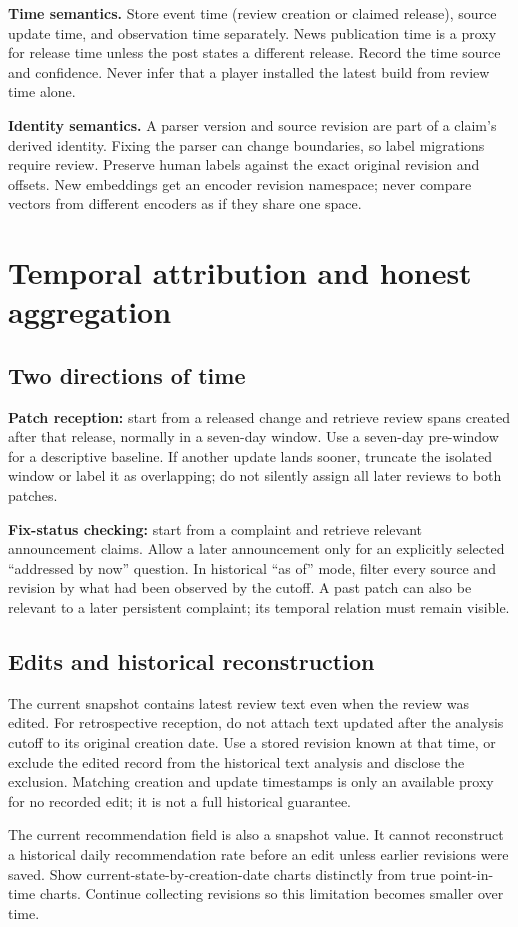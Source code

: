 \documentclass[10pt,letterpaper]{article}
\newcommand{\key}[1]{\textbf{\color{ink}#1}}
\newcommand{\nextsection}[1]{\clearpage\section{#1}}
\begin{document}
\key{Time semantics.} Store event time (review creation or claimed release), source update time, and observation time separately. News publication time is a proxy for release time unless the post states a different release. Record the time source and confidence. Never infer that a player installed the latest build from review time alone.

\key{Identity semantics.} A parser version and source revision are part of a claim's derived identity. Fixing the parser can change boundaries, so label migrations require review. Preserve human labels against the exact original revision and offsets. New embeddings get an encoder revision namespace; never compare vectors from different encoders as if they share one space.

\nextsection{Temporal attribution and honest aggregation}
\subsection{Two directions of time}
\key{Patch reception:} start from a released change and retrieve review spans created after that release, normally in a seven-day window. Use a seven-day pre-window for a descriptive baseline. If another update lands sooner, truncate the isolated window or label it as overlapping; do not silently assign all later reviews to both patches.

\key{Fix-status checking:} start from a complaint and retrieve relevant announcement claims. Allow a later announcement only for an explicitly selected ``addressed by now'' question. In historical ``as of'' mode, filter every source and revision by what had been observed by the cutoff. A past patch can also be relevant to a later persistent complaint; its temporal relation must remain visible.

\subsection{Edits and historical reconstruction}
The current snapshot contains latest review text even when the review was edited. For retrospective reception, do not attach text updated after the analysis cutoff to its original creation date. Use a stored revision known at that time, or exclude the edited record from the historical text analysis and disclose the exclusion. Matching creation and update timestamps is only an available proxy for no recorded edit; it is not a full historical guarantee.

The current recommendation field is also a snapshot value. It cannot reconstruct a historical daily recommendation rate before an edit unless earlier revisions were saved. Show current-state-by-creation-date charts distinctly from true point-in-time charts. Continue collecting revisions so this limitation becomes smaller over time.
\end{document}
